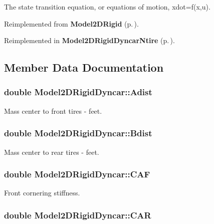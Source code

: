 The state transition equation, or equations of motion, xdot=f(x,u).



Reimplemented from {\bf Model2DRigid} {\rm (p.\,\pageref{classModel2DRigid_a3})}.

Reimplemented in {\bf Model2DRigid\-Dyncar\-Ntire} {\rm (p.\,\pageref{classModel2DRigidDyncarNtire_a2})}.

\subsection{Member Data Documentation}
\subsubsection{\setlength{\rightskip}{0pt plus 5cm}double Model2DRigid\-Dyncar::Adist}\label{classModel2DRigidDyncar_m3}


Mass center to front tires - feet.

\subsubsection{\setlength{\rightskip}{0pt plus 5cm}double Model2DRigid\-Dyncar::Bdist}\label{classModel2DRigidDyncar_m4}


Mass center to rear tires - feet.

\subsubsection{\setlength{\rightskip}{0pt plus 5cm}double Model2DRigid\-Dyncar::CAF}\label{classModel2DRigidDyncar_m1}


Front cornering stiffness.

\subsubsection{\setlength{\rightskip}{0pt plus 5cm}double Model2DRigid\-Dyncar::CAR}\label{classModel2DRigidDyncar_m2}


